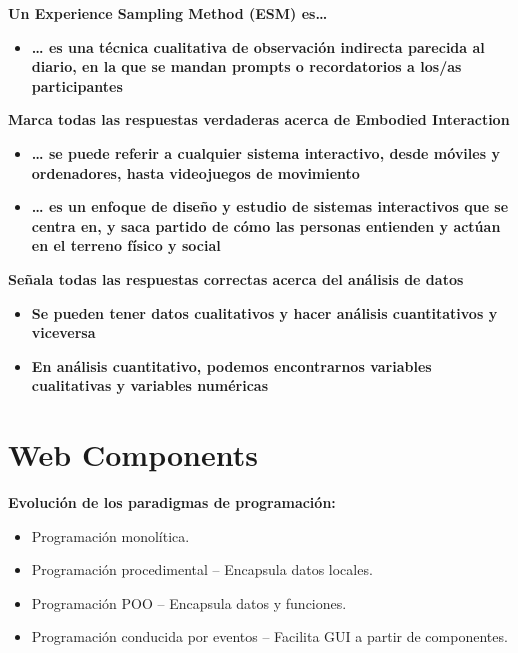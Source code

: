 \textbf{Un Experience Sampling Method (ESM) es\ldots{}}

\begin{itemize}
\tightlist
\item
  \textbf{\ldots{} es una técnica cualitativa de observación indirecta
  parecida al diario, en la que se mandan prompts o recordatorios a
  los/as participantes}
\end{itemize}

\textbf{Marca todas las respuestas verdaderas acerca de Embodied
Interaction}

\begin{itemize}
\tightlist
\item
  \textbf{\ldots{} se puede referir a cualquier sistema interactivo,
  desde móviles y ordenadores, hasta videojuegos de movimiento}
\item
  \textbf{\ldots{} es un enfoque de diseño y estudio de sistemas
  interactivos que se centra en, y saca partido de cómo las personas
  entienden y actúan en el terreno físico y social}
\end{itemize}

\textbf{Señala todas las respuestas correctas acerca del análisis de
datos}

\begin{itemize}
\tightlist
\item
  \textbf{Se pueden tener datos cualitativos y hacer análisis
  cuantitativos y viceversa}
\item
  \textbf{En análisis cuantitativo, podemos encontrarnos variables
  cualitativas y variables numéricas}
\end{itemize}

\hypertarget{web-components}{%
\section{Web Components}\label{web-components}}

\textbf{Evolución de los paradigmas de programación:}

\begin{itemize}
\item
  Programación monolítica.
\item
  Programación procedimental -- Encapsula datos locales.
\item
  Programación POO -- Encapsula datos y funciones.
\item
  Programación conducida por eventos -- Facilita GUI a partir de
  componentes.
\end{itemize}

